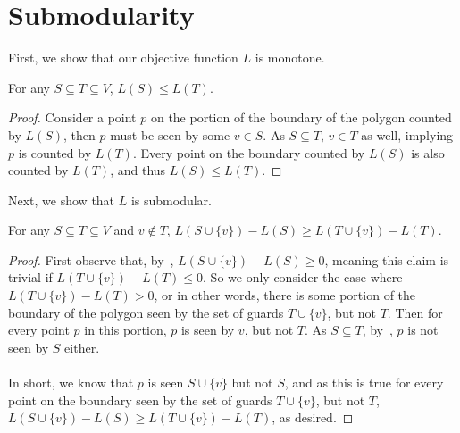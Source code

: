 \section{Submodularity}

First, we show that our objective function $L$ is monotone.

\begin{observation}\label{obs:monotone}
    For any $S\subseteq T\subseteq V$, $L(S)\leq L(T)$.
\end{observation}

\begin{proof}
    Consider a point $p$ on the portion of the boundary of the polygon counted by $L(S)$, then $p$ must be seen by some $v\in S$. As $S\subseteq T$, $v\in T$ as well, implying $p$ is counted by $L(T)$. Every point on the boundary counted by $L(S)$ is also counted by $L(T)$, and thus $L(S)\leq L(T)$. 
\end{proof}
\noindent
Next, we show that $L$ is submodular.

\begin{claim}\label{clm:submodular}
    For any $S\subseteq T\subseteq V$ and $v\notin T$, $L(S\cup\{v\})-L(S)\geq L(T\cup\{v\})-L(T)$.
\end{claim}

\begin{proof}
    First observe that, by~, $L(S\cup\{v\})-L(S)\geq 0$, meaning this claim is trivial if $L(T\cup\{v\})-L(T)\leq 0$. So we only consider the case where $L(T\cup\{v\})-L(T)>0$, or in other words, there is some portion of the boundary of the polygon seen by the set of guards $T\cup\{v\}$, but not $T$. Then for every point $p$ in this portion, $p$ is seen by $v$, but not $T$. As $S\subseteq T$, by~, $p$ is not seen by $S$ either. \\\\
    In short, we know that $p$ is seen $S\cup\{v\}$ but not $S$, and as this is true for every point on the boundary seen by the set of guards $T\cup\{v\}$, but not $T$, $L(S\cup\{v\})-L(S)\geq L(T\cup\{v\})-L(T)$, as desired.
\end{proof}

